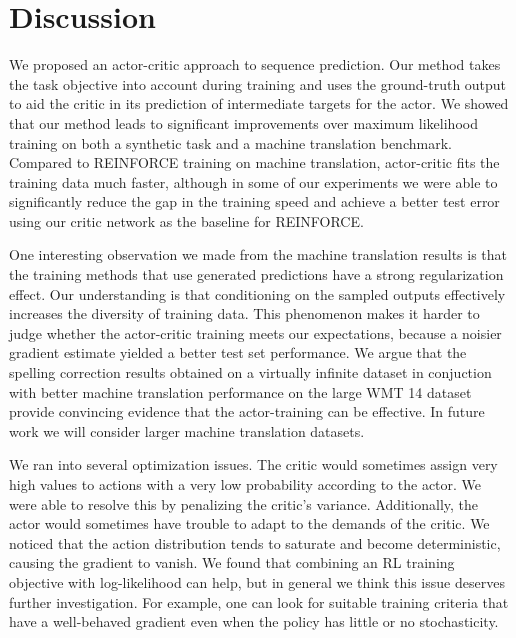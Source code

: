 \documentclass{article} %
\begin{document}
\section{Discussion}
\label{sec:discuss}

We proposed an actor-critic approach to sequence prediction. Our method takes
the task objective into account during training and uses the ground-truth output to aid
the critic in its prediction of intermediate targets for the actor. We showed that our method leads to
significant improvements over maximum likelihood training on both a synthetic task
and a machine translation benchmark. Compared to REINFORCE training on machine translation,
actor-critic fits the training data much faster, although in some of our
experiments we were able to significantly reduce the gap in the training speed and
achieve a better test error using our critic network as the baseline for
REINFORCE.


One interesting observation we made from the machine translation results is
that the training methods that use generated predictions have a strong
regularization effect. Our understanding is that conditioning on the sampled
outputs effectively increases the diversity of training data. This phenomenon
makes it harder to judge whether the actor-critic training meets our
expectations, because a noisier gradient estimate yielded a better test set
performance. We argue that the spelling correction results obtained on
a virtually infinite dataset in conjuction with better machine translation
performance on the large WMT 14 dataset provide convincing evidence that the
actor-training can be effective. In future work we will consider larger
machine translation datasets.

We ran into several optimization issues.
The critic would sometimes assign very high values to
actions with a very low probability according to the actor. We were able to
resolve this by penalizing the critic's variance. Additionally, 
the actor would sometimes have trouble to adapt to the demands of
the critic. We noticed that the action distribution tends to saturate
and become deterministic, causing the gradient to vanish. We found that
combining an RL training objective with log-likelihood can help, but in general
we think this issue deserves further investigation. For example, one can look
for suitable training criteria that have a well-behaved gradient even when the
policy has little or no stochasticity.
\end{document}
